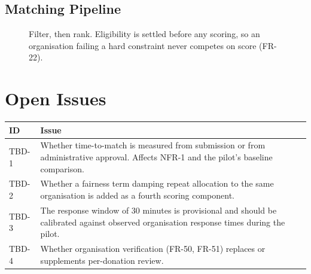 \documentclass[11pt,a4paper]{article}
\begin{document}
\subsection{Matching Pipeline}
\begin{figure}[h]
\centering
{}
\caption{Filter, then rank. Eligibility is settled before any scoring, so an
organisation failing a hard constraint never competes on score (FR-22).}
\end{figure}

\section{Open Issues}
\begin{longtable}{@{}p{1.6cm}p{13cm}@{}}
\toprule
\textbf{ID} & \textbf{Issue} \\
\midrule
\endhead
TBD-1 & Whether time-to-match is measured from submission or from administrative approval. Affects NFR-1 and the pilot's baseline comparison. \\
TBD-2 & Whether a fairness term damping repeat allocation to the same organisation is added as a fourth scoring component. \\
TBD-3 & The response window of 30 minutes is provisional and should be calibrated against observed organisation response times during the pilot. \\
TBD-4 & Whether organisation verification (FR-50, FR-51) replaces or supplements per-donation review. \\
\bottomrule
\end{longtable}
\end{document}
